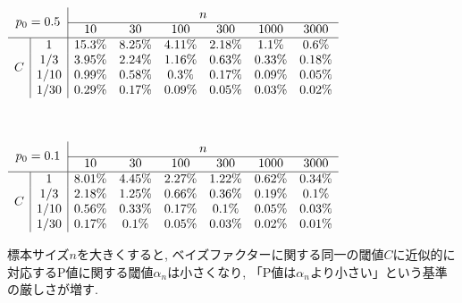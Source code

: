 \documentclass[%
  lualatex,
  ja=standard,
  textwidth-limit=60,
  a4paper,
  12pt,
  oneside,
  everyparhook=compat]{bxjsarticle}
\title{\Huge{\textbf{\TITLE}}}
\author{\LARGE{\textbf{\AUTHOR}}}
\date{\Large{\textbf{\DATE}}}
\begin{document}
\maketitle

\begin{table}[htbp]
\centering
\begin{minipage}{0.95\columnwidth}
\centering
\(
\begin{array}{cc|cccccc}
\multicolumn{2}{c|}{\multirow{2}{*}{$p_0=0.5$}}
 & \multicolumn{6}{c}{n} \\
\cline{3-8}
 & & 10 & 30 & 100 & 300 & 1000 & 3000 \\
\hline
\multirow{4}{*}{$C$}
 & \multicolumn{1}{|c|}{1} & 15.3\% & 8.25\% & 4.11\% & 2.18\% & 1.1\% & 0.6\% \\
 & \multicolumn{1}{|c|}{1/3} & 3.95\% & 2.24\% & 1.16\% & 0.63\% & 0.33\% & 0.18\% \\
 & \multicolumn{1}{|c|}{1/10} & 0.99\% & 0.58\% & 0.3\% & 0.17\% & 0.09\% & 0.05\% \\
 & \multicolumn{1}{|c|}{1/30} & 0.29\% & 0.17\% & 0.09\% & 0.05\% & 0.03\% & 0.02\% \\
\end{array}
\)
\label{table:ベイズファクターの閾値に対応する有意水準-0.5}
\end{minipage}
\\
\begin{minipage}{0.95\columnwidth}
\centering
\(
\begin{array}{cc|cccccc}
\multicolumn{2}{c|}{\multirow{2}{*}{$p_0=0.1$}}
 & \multicolumn{6}{c}{n} \\
\cline{3-8}
 & & 10 & 30 & 100 & 300 & 1000 & 3000 \\
\hline
\multirow{4}{*}{$C$}
 & \multicolumn{1}{|c|}{1} & 8.01\% & 4.45\% & 2.27\% & 1.22\% & 0.62\% & 0.34\% \\
 & \multicolumn{1}{|c|}{1/3} & 2.18\% & 1.25\% & 0.66\% & 0.36\% & 0.19\% & 0.1\% \\
 & \multicolumn{1}{|c|}{1/10} & 0.56\% & 0.33\% & 0.17\% & 0.1\% & 0.05\% & 0.03\% \\
 & \multicolumn{1}{|c|}{1/30} & 0.17\% & 0.1\% & 0.05\% & 0.03\% & 0.02\% & 0.01\% \\
\end{array}
\)
\label{table:ベイズファクターの閾値に対応する有意水準-0.1}
\end{minipage}
\begin{minipage}{0.95\columnwidth}\small
標本サイズ$n$を大きくすると, ベイズファクターに関する同一の閾値$C$に近似的に対応するP値に関する閾値$\alpha_n$は小さくなり, 「P値は$\alpha_n$より小さい」という基準の厳しさが増す.
\end{minipage}
\end{table}

\end{document}
